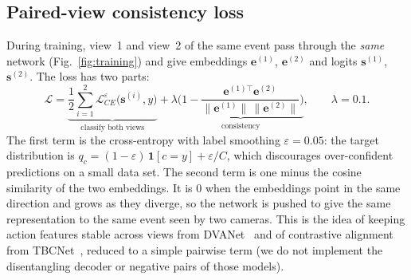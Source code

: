 \documentclass[runningheads]{llncs}
\begin{document}
\subsection{Paired-view consistency loss}
During training, view~1 and view~2 of the same event pass through the \emph{same} network (Fig.~\ref{fig:training}) and give embeddings $\mathbf e^{(1)}$, $\mathbf e^{(2)}$ and logits $\mathbf s^{(1)}$, $\mathbf s^{(2)}$. The loss has two parts:
\begin{equation}
\mathcal L=\underbrace{\frac12\sum_{i=1}^{2}\mathcal L^{\varepsilon}_{CE}\big(\mathbf s^{(i)},y\big)}_{\text{classify both views}}
+\lambda\underbrace{\Big(1-\frac{\mathbf e^{(1)\top}\mathbf e^{(2)}}{\|\mathbf e^{(1)}\|\,\|\mathbf e^{(2)}\|}\Big)}_{\text{consistency}},\qquad \lambda=0.1 .
\end{equation}
The first term is the cross-entropy with label smoothing $\varepsilon=0.05$: the target distribution is $q_c=(1-\varepsilon)\,\mathbf 1[c=y]+\varepsilon/C$, which discourages over-confident predictions on a small data set. The second term is one minus the cosine similarity of the two embeddings. It is 0 when the embeddings point in the same direction and grows as they diverge, so the network is pushed to give the same representation to the same event seen by two cameras. This is the idea of keeping action features stable across views from DVANet~\cite{siddiqui2024} and of contrastive alignment from TBCNet~\cite{yang2026}, reduced to a simple pairwise term (we do not implement the disentangling decoder or negative pairs of those models).
\end{document}
